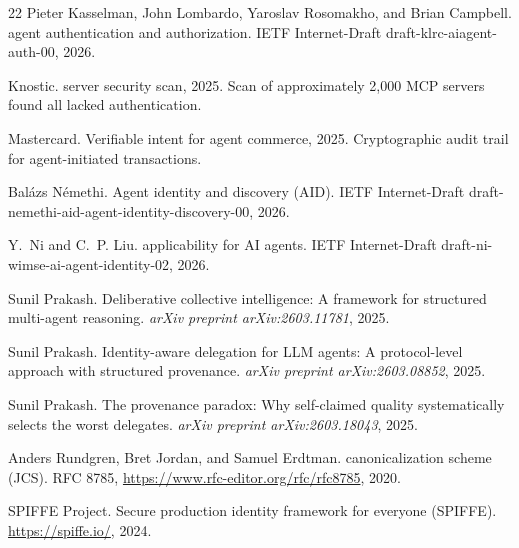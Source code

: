 \documentclass[11pt,a4paper]{article}
\begin{document}
\begin{thebibliography}{22}
Pieter Kasselman, John Lombardo, Yaroslav Rosomakho, and Brian Campbell.
 agent authentication and authorization.
\newblock IETF Internet-Draft draft-klrc-aiagent-auth-00, 2026.

{Knostic}.
 server security scan, 2025.
\newblock Scan of approximately 2,000 MCP servers found all lacked
  authentication.

{Mastercard}.
\newblock Verifiable intent for agent commerce, 2025.
\newblock Cryptographic audit trail for agent-initiated transactions.

Bal{\'a}zs N{\'e}methi.
\newblock Agent identity and discovery ({AID}).
\newblock IETF Internet-Draft draft-nemethi-aid-agent-identity-discovery-00,
  2026.

Y.~Ni and C.~P. Liu.
 applicability for {AI} agents.
\newblock IETF Internet-Draft draft-ni-wimse-ai-agent-identity-02, 2026.

Sunil Prakash.
\newblock Deliberative collective intelligence: A framework for structured
  multi-agent reasoning.
\newblock \emph{arXiv preprint arXiv:2603.11781}, 2025{}.

Sunil Prakash.
\newblock Identity-aware delegation for {LLM} agents: A protocol-level approach
  with structured provenance.
\newblock \emph{arXiv preprint arXiv:2603.08852}, 2025{}.

Sunil Prakash.
\newblock The provenance paradox: Why self-claimed quality systematically
  selects the worst delegates.
\newblock \emph{arXiv preprint arXiv:2603.18043}, 2025{}.

Anders Rundgren, Bret Jordan, and Samuel Erdtman.
 canonicalization scheme ({JCS}).
\newblock RFC 8785, \url{https://www.rfc-editor.org/rfc/rfc8785}, 2020.

{SPIFFE Project}.
\newblock Secure production identity framework for everyone ({SPIFFE}).
\newblock \url{https://spiffe.io/}, 2024.


\end{thebibliography}
\end{document}
